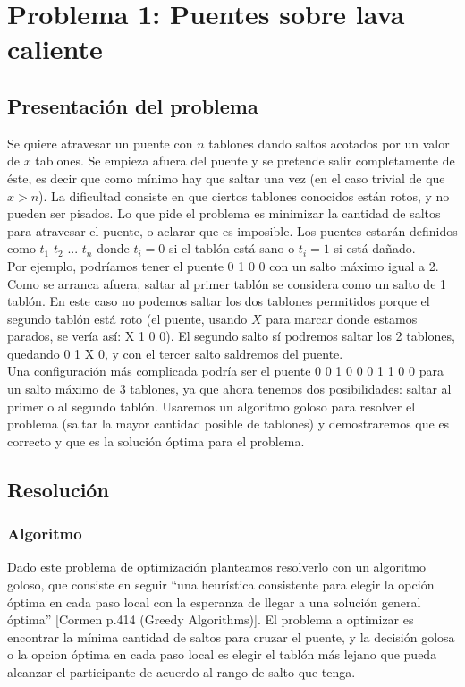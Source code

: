 \section{Problema 1: Puentes sobre lava caliente}

\subsection{Presentaci\'on del problema}
Se quiere atravesar un puente con $n$ tablones dando saltos acotados por un valor de $x$ tablones. Se empieza afuera del puente y se pretende salir completamente de éste, es decir que como mínimo hay que saltar una vez (en el caso trivial de que $x > n$). La dificultad consiste en que ciertos tablones conocidos están rotos, y no pueden ser pisados. Lo que pide el problema es minimizar la cantidad de saltos para atravesar el puente, o aclarar que es imposible. Los puentes estarán definidos como $t_1$ $t_2$ $...$ $t_n$ donde $t_i = 0$ si el tablón está sano o $t_i = 1$ si está dañado. \\
Por ejemplo, podríamos tener el puente 0 1 0 0 con un salto máximo igual a 2. Como se arranca afuera, saltar al primer tablón se considera como un salto de 1 tablón. En este caso no podemos saltar los dos tablones permitidos porque el segundo tablón está roto (el puente, usando $X$ para marcar donde estamos parados, se vería así: X 1 0 0). El segundo salto sí podremos saltar los 2 tablones, quedando 0 1 X 0, y con el tercer salto saldremos del puente. \\
Una configuración más complicada podría ser el puente 0 0 1 0 0 0 1 1 0 0 para un salto máximo de 3 tablones, ya que ahora tenemos dos posibilidades: saltar al primer o al segundo tablón. Usaremos un algoritmo goloso para resolver el problema (saltar la mayor cantidad posible de tablones) y demostraremos que es correcto y que es la solución óptima para el problema.


\subsection{Resoluci\'on}
\subsubsection{Algoritmo}
Dado este problema de optimización planteamos resolverlo con un algoritmo goloso, que consiste en seguir ``una heurística consistente para elegir la opción óptima en cada paso local con la esperanza de llegar a una solución general óptima'' [Cormen p.414 (Greedy Algorithms)].
El problema a optimizar es encontrar la mínima cantidad de saltos para cruzar el puente, y la decisi\'on golosa o la opcion \'optima en cada paso local es elegir el tabl\'on m\'as lejano que pueda alcanzar el participante de acuerdo al rango de salto que tenga. 

